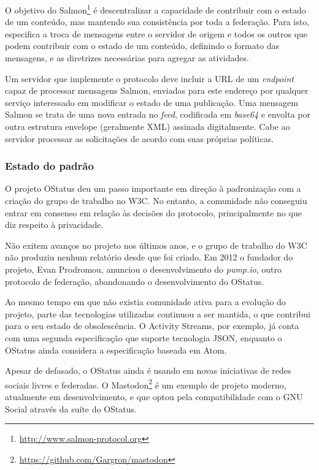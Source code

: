 O objetivo do Salmon\footnote{\url{http://www.salmon-protocol.org}} é descentralizar
a capacidade de contribuir com o estado de um conteúdo, mas mantendo sua
consistência por toda a federação. Para isto, especifica a troca de mensagens entre
o servidor de origem e todos os outros que podem contribuir com o estado de um
conteúdo, definindo o formato das mensagens, e as diretrizes necessárias para
agregar as atividades.

Um servidor que implemente o protocolo deve incluir a URL de um \textit{endpoint}
capaz de processar mensagens Salmon, enviadas para este endereço por qualquer
serviço interessado em modificar o estado de uma publicação. Uma mensagem Salmon se
trata de uma nova entrada no \textit{feed}, codificada em \textit{base64} e envolta
por outra estrutura envelope (geralmente XML) assinada digitalmente. Cabe ao
servidor processar as solicitações de acordo com suas próprias políticas.

\subsubsection{Estado do padrão}

O projeto OStatus deu um passo importante em direção à padronização com a criação do
grupo de trabalho no W3C. No entanto, a comunidade não conseguiu entrar em consenso
em relação às decisões do protocolo, principalmente no que diz respeito à
privacidade.

Não exitem avanços no projeto nos últimos anos, e o grupo de trabalho do W3C não
produziu nenhum relatório desde que foi criado. Em 2012 o fundador do projeto, Evan
Prodromou, anunciou o desenvolvimento do \textit{pump.io}, outro protocolo de
federação, abandonando o desenvolvimento do OStatus.

Ao mesmo tempo em que não existia comunidade ativa para a evolução do projeto, parte
das tecnologias utilizadas continuou a ser mantida, o que contribui para o seu
estado de obsolescência. O Activity Streams, por exemplo, já conta com uma segunda
especificação que suporte tecnologia JSON, enquanto o OStatus ainda considera a
especificação baseada em Atom.

Apesar de defasado, o OStatus ainda é usando em novas iniciativas de redes sociais
livres e federadas. O Mastodon\footnote{\url{https://github.com/Gargron/mastodon}} é
um exemplo de projeto moderno, atualmente em desenvolvimento, e que optou pela
compatibilidade com o GNU Social através da suíte do OStatus.


